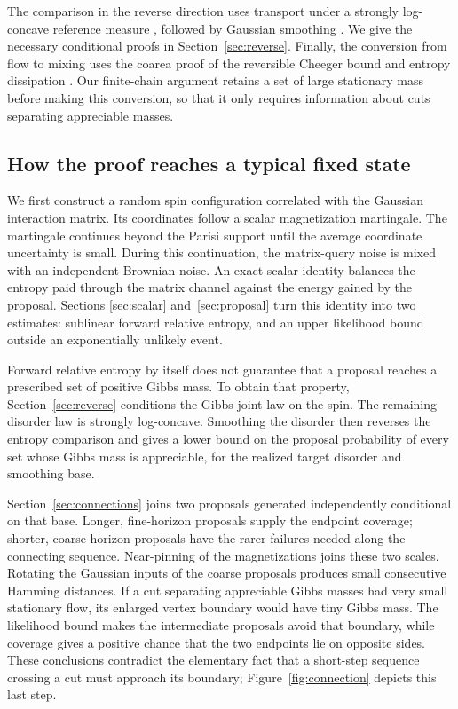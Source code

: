 The comparison in the reverse direction uses transport under a
strongly log-concave reference measure
\cite[Corollary~3.10]{BKM2005}, followed by Gaussian smoothing
\cite[Lemma~11]{LugosiNeu2022}. We give the necessary conditional
proofs in Section~\ref{sec:reverse}. Finally, the conversion from
flow to mixing uses the coarea proof of the reversible Cheeger bound
\cite[Theorem~3.5]{LawlerSokal1988} and entropy dissipation
\cite[Lemmas~2.5 and~2.7]{DiaconisSaloffCoste1996}. Our finite-chain
argument retains a set of large stationary mass before making this
conversion, so that it only requires information about cuts separating
appreciable masses.

\subsection{How the proof reaches a typical fixed state}

We first construct a random spin configuration correlated with the
Gaussian interaction matrix. Its coordinates follow a scalar
magnetization martingale. The martingale continues beyond the Parisi
support until the average coordinate uncertainty is small. During this continuation,
the matrix-query noise is mixed with an independent Brownian noise.
An exact scalar identity balances the entropy paid through the matrix
channel against the energy gained by the proposal. Sections
\ref{sec:scalar} and~\ref{sec:proposal} turn this identity into two
estimates: sublinear forward relative entropy, and an upper likelihood
bound outside an exponentially unlikely event.

Forward relative entropy by itself does not guarantee that a proposal
reaches a prescribed set of positive Gibbs mass. To obtain that
property, Section~\ref{sec:reverse} conditions the Gibbs joint law on
the spin. The remaining disorder law is strongly log-concave. Smoothing
the disorder then reverses the entropy comparison and gives a lower
bound on the proposal probability of every set whose Gibbs mass is
appreciable, for the realized target disorder and smoothing base.

Section~\ref{sec:connections} joins two proposals generated independently
conditional on that base. Longer, fine-horizon proposals supply the
endpoint coverage; shorter, coarse-horizon proposals have the rarer
failures needed along the connecting sequence. Near-pinning of the
magnetizations joins these two scales. Rotating the Gaussian inputs of
the coarse proposals produces small consecutive Hamming distances.
If a cut separating appreciable Gibbs masses had very small
stationary flow, its enlarged vertex boundary would have tiny Gibbs
mass. The likelihood bound makes the intermediate proposals avoid that
boundary, while coverage gives a positive chance that the two endpoints
lie on opposite sides. These conclusions contradict the elementary
fact that a short-step sequence crossing a cut must approach its
boundary; Figure~\ref{fig:connection} depicts this last step.

